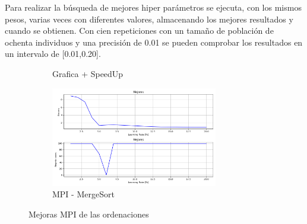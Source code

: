 Para realizar la búsqueda de mejores hiper parámetros se ejecuta, con los mismos pesos, varias veces con diferentes valores, almacenando los mejores resultados y cuando se obtienen. Con cien repeticiones con un tamaño de población de ochenta individuos y una precisión de 0.01 se pueden comprobar los resultados en un intervalo de [0.01,0.20].


\begin{figure}[!h]
	\centering
	
	
	\begin{subfigure}[t]{0.35\textwidth}
		\label{fig:redneubusqueda}
		\caption{Grafica + SpeedUp}
	\end{subfigure}
	\hfill
	\begin{subfigure}[t]{0.55\textwidth}
		\centering
		\includegraphics[width=0.8\textwidth,height=0.8\textwidth]{images/chapter_4/redneu_err}
		
		\caption{MPI - MergeSort}
		\label{fig:Errores}
	\end{subfigure}
	
	\caption{Mejoras MPI de las ordenaciones}
	\label{fig:Red Neuronal - Busqueda}
\end{figure}





